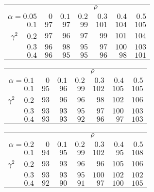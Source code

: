 \begin{tabular}{r|rrrrrr}
\hline\hline
 &\multicolumn{6}{c}{$\rho$} \\ 
 $\alpha = 0.05$ & $0$ & $0.1$ & $0.2$ & $0.3$ & $0.4$ & $0.5$ \\ 
 \hline$0.1$ & $ 97$ & $ 97$ & $ 99$ & $101$ & $104$ & $105$\\ 
$\gamma^2\;\;\;$ $0.2$ & $ 97$ & $ 96$ & $ 97$ & $ 99$ & $101$ & $104$\\ 
$0.3$ & $ 96$ & $ 98$ & $ 95$ & $ 97$ & $100$ & $103$\\ 
$0.4$ & $ 96$ & $ 95$ & $ 95$ & $ 96$ & $ 98$ & $101$\\ 
 \hline 
 \end{tabular}
 
 \vspace{2em} 
 
\begin{tabular}{r|rrrrrr}
\hline\hline
 &\multicolumn{6}{c}{$\rho$} \\ 
 $\alpha = 0.1$ & $0$ & $0.1$ & $0.2$ & $0.3$ & $0.4$ & $0.5$ \\ 
 \hline$0.1$ & $ 95$ & $ 96$ & $ 99$ & $102$ & $105$ & $105$\\ 
$\gamma^2\;\;\;$ $0.2$ & $ 93$ & $ 96$ & $ 96$ & $ 98$ & $102$ & $106$\\ 
$0.3$ & $ 93$ & $ 93$ & $ 95$ & $ 97$ & $100$ & $103$\\ 
$0.4$ & $ 93$ & $ 93$ & $ 92$ & $ 96$ & $ 97$ & $103$\\ 
 \hline 
 \end{tabular}
 
 \vspace{2em} 
 
\begin{tabular}{r|rrrrrr}
\hline\hline
 &\multicolumn{6}{c}{$\rho$} \\ 
 $\alpha = 0.2$ & $0$ & $0.1$ & $0.2$ & $0.3$ & $0.4$ & $0.5$ \\ 
 \hline$0.1$ & $ 94$ & $ 95$ & $ 99$ & $102$ & $ 95$ & $108$\\ 
$\gamma^2\;\;\;$ $0.2$ & $ 93$ & $ 93$ & $ 96$ & $ 96$ & $105$ & $106$\\ 
$0.3$ & $ 93$ & $ 93$ & $ 95$ & $100$ & $102$ & $102$\\ 
$0.4$ & $ 92$ & $ 90$ & $ 91$ & $ 97$ & $100$ & $105$\\ 
 \hline 
 \end{tabular}